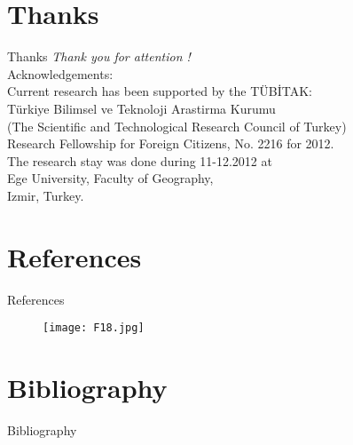 \documentclass[pdflatex,compress,8pt,
	xcolor={dvipsnames,dvipsnames,svgnames,x11names,table},
	hyperref={colorlinks = true,
	breaklinks = true, 
	urlcolor = NavyBlue, 
	breaklinks = true}]{beamer}
\begin{document}
\section{Thanks}
\begin{frame}{Thanks}
  	\centering \LARGE 
  	\emph{Thank you for attention !}\\
	\vspace{5em}
\normalsize
Acknowledgements: \\
Current research has been supported by the T\"{U}BİTAK: \\
T\"{u}rkiye Bilimsel ve Teknoloji Arastirma Kurumu\\
(The Scientific and Technological Research Council of Turkey) \\
Research Fellowship for Foreign Citizens, No. 2216 for 2012.\\
The research stay was done during 11-12.2012 at \\
Ege University, Faculty of Geography,\\
Izmir, Turkey.
\end{frame}

\section{References}
\begin{frame}{References}
\begin{figure}[H]
	\centering
		\texttt{[image: F18.jpg]}
\end{figure}
\end{frame}

\section{Bibliography}
\large{Bibliography}
\nocite{*}
\printbibliography
\end{document}
